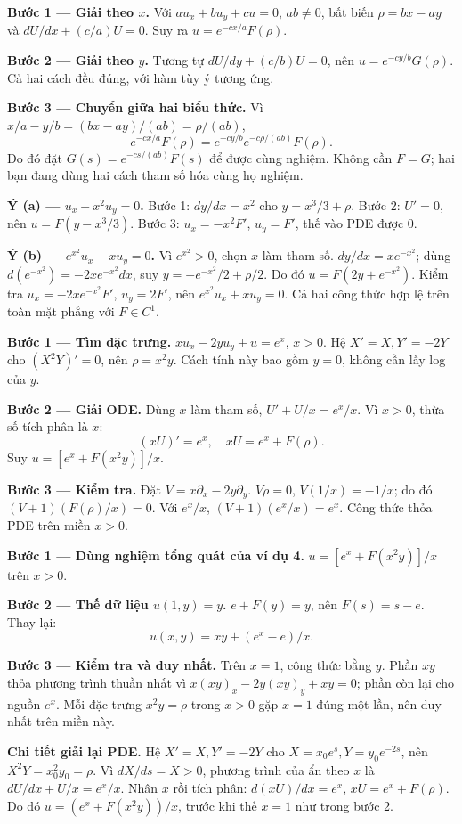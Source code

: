 \textbf{Bước 1 — Giải theo $x$.} Với $au_x+bu_y+cu=0$, $ab\ne0$, bất biến $\rho=bx-ay$ và $dU/dx+(c/a)U=0$. Suy ra $u=e^{-cx/a}F(\rho)$.

\textbf{Bước 2 — Giải theo $y$.} Tương tự $dU/dy+(c/b)U=0$, nên $u=e^{-cy/b}G(\rho)$. Cả hai cách đều đúng, với hàm tùy ý tương ứng.

\textbf{Bước 3 — Chuyển giữa hai biểu thức.} Vì $x/a-y/b=(bx-ay)/(ab)=\rho/(ab)$,
\[e^{-cx/a}F(\rho)=e^{-cy/b}e^{-c\rho/(ab)}F(\rho).\]
Do đó đặt $G(s)=e^{-cs/(ab)}F(s)$ để được cùng nghiệm. Không cần $F=G$; hai bạn đang dùng hai cách tham số hóa cùng họ nghiệm.

\textbf{Ý (a) — $u_x+x^2u_y=0$.} Bước 1: $dy/dx=x^2$ cho $y=x^3/3+\rho$. Bước 2: $U'=0$, nên $u=F(y-x^3/3)$. Bước 3: $u_x=-x^2F'$, $u_y=F'$, thế vào PDE được 0.

\textbf{Ý (b) — $e^{x^2}u_x+xu_y=0$.} Vì $e^{x^2}>0$, chọn $x$ làm tham số. $dy/dx=xe^{-x^2}$; dùng $d(e^{-x^2})=-2xe^{-x^2}dx$, suy $y=-e^{-x^2}/2+\rho/2$. Do đó $u=F(2y+e^{-x^2})$. Kiểm tra $u_x=-2xe^{-x^2}F'$, $u_y=2F'$, nên $e^{x^2}u_x+xu_y=0$. Cả hai công thức hợp lệ trên toàn mặt phẳng với $F\in C^1$.

\textbf{Bước 1 — Tìm đặc trưng.} $xu_x-2yu_y+u=e^x$, $x>0$. Hệ $X'=X,Y'=-2Y$ cho $(X^2Y)'=0$, nên $\rho=x^2y$. Cách tính này bao gồm $y=0$, không cần lấy log của $y$.

\textbf{Bước 2 — Giải ODE.} Dùng $x$ làm tham số, $U'+U/x=e^x/x$. Vì $x>0$, thừa số tích phân là $x$:
\[(xU)'=e^x,\quad xU=e^x+F(\rho).\]
Suy $u=[e^x+F(x^2y)]/x$.

\textbf{Bước 3 — Kiểm tra.} Đặt $V=x\partial_x-2y\partial_y$. $V\rho=0$, $V(1/x)=-1/x$; do đó $(V+1)(F(\rho)/x)=0$. Với $e^x/x$, $(V+1)(e^x/x)=e^x$. Công thức thỏa PDE trên miền $x>0$.

\textbf{Bước 1 — Dùng nghiệm tổng quát của ví dụ 4.} $u=[e^x+F(x^2y)]/x$ trên $x>0$.

\textbf{Bước 2 — Thế dữ liệu $u(1,y)=y$.} $e+F(y)=y$, nên $F(s)=s-e$. Thay lại:
\[u(x,y)=xy+(e^x-e)/x.\]

\textbf{Bước 3 — Kiểm tra và duy nhất.} Trên $x=1$, công thức bằng $y$. Phần $xy$ thỏa phương trình thuần nhất vì $x(xy)_x-2y(xy)_y+xy=0$; phần còn lại cho nguồn $e^x$. Mỗi đặc trưng $x^2y=\rho$ trong $x>0$ gặp $x=1$ đúng một lần, nên duy nhất trên miền này.

\textbf{Chi tiết giải lại PDE.} Hệ $X'=X,Y'=-2Y$ cho $X=x_0e^s,Y=y_0e^{-2s}$, nên $X^2Y=x_0^2y_0=\rho$. Vì $dX/ds=X>0$, phương trình của ẩn theo $x$ là $dU/dx+U/x=e^x/x$. Nhân $x$ rồi tích phân: $d(xU)/dx=e^x$, $xU=e^x+F(\rho)$. Do đó $u=(e^x+F(x^2y))/x$, trước khi thế $x=1$ như trong bước 2.

